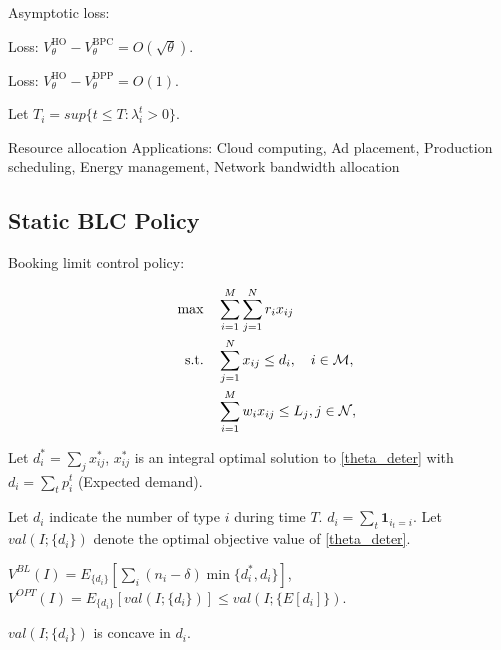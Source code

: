 Asymptotic loss:


\begin{lem}
    Loss: $V_{\theta}^{\text{HO}} - V_{\theta}^{\text{BPC}} = O(\sqrt{\theta})$. 
\end{lem}

\begin{lem}
    Loss: $V_{\theta}^{\text{HO}} - V_{\theta}^{\text{DPP}} = O(1)$. 
\end{lem}

Let $T_{i} = sup \{t \leq T: \lambda_{i}^{t} > 0\}$. 

Resource allocation
Applications: Cloud computing, Ad placement, Production scheduling, Energy management, Network bandwidth allocation

\newpage

\subsection{Static BLC Policy}
Booking limit control policy:

\begin{align}
    \quad \max \quad & \sum_{i=1}^{M}  \sum_{j= 1}^{N} r_{i} x_{ij} \label{theta_deter} \\
    \text {s.t.} \quad & \sum_{j= 1}^{N} x_{ij} \leq d_{i}, \quad i \in \mathcal{M}, \notag \\ 
    & \sum_{i=1}^{M} w_{i} x_{ij} \leq L_j, j \in \mathcal{N}, \notag 
\end{align}

Let $d_{i}^{*} = \sum_{j} x_{ij}^{*}$, $x_{ij}^{*}$ is an integral optimal solution to \eqref{theta_deter} with $d_{i} = \sum_{t} p_{i}^{t}$ (Expected demand).

Let $d_{i}$ indicate the number of type $i$ during time $T$. $d_{i} = \sum_{t} \bm{1}_{i_{t} = i}$.
Let $val(I; \{d_{i}\})$ denote the optimal objective value of \eqref{theta_deter}.

$V^{BL}(I) = E_{\{d_{i}\}}[\sum_{i} (n_{i}-\delta) \min\{d_{i}^{*}, d_{i}\}]$, $V^{OPT}(I) = E_{\{d_{i}\}} [val(I; \{d_{i}\})] \leq val(I; \{E[d_{i}]\})$.

$val(I; \{d_{i}\})$ is concave in $d_{i}$.

